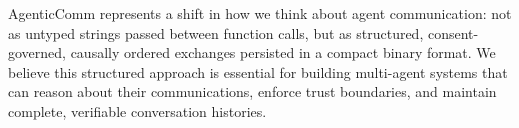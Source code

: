 \documentclass[10pt, twocolumn]{article}
\begin{document}
AgenticComm represents a shift in how we think about agent communication: not as untyped strings passed between function calls, but as structured, consent-governed, causally ordered exchanges persisted in a compact binary format. We believe this structured approach is essential for building multi-agent systems that can reason about their communications, enforce trust boundaries, and maintain complete, verifiable conversation histories.




\end{document}
